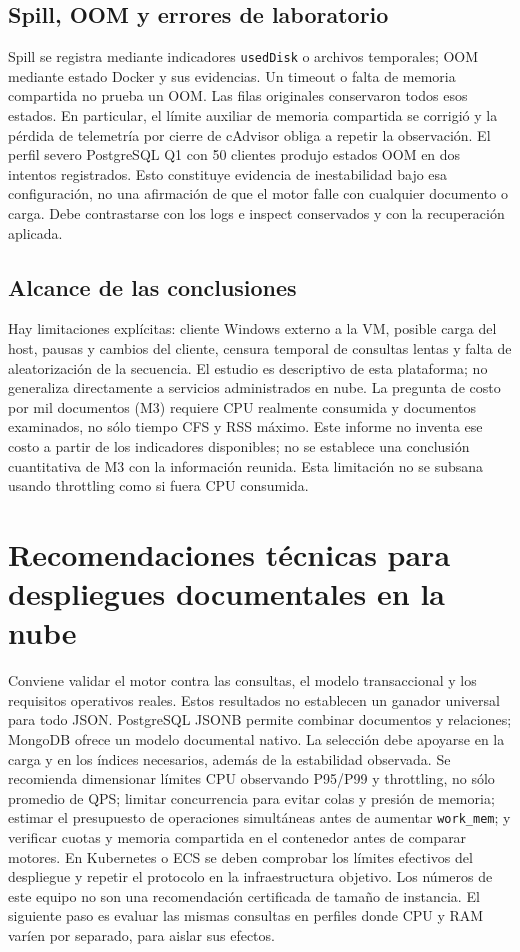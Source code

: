 \documentclass[11pt,letterpaper]{article}
\begin{document}
\subsection{Spill, OOM y errores de laboratorio}
Spill se registra mediante indicadores \texttt{usedDisk} o archivos temporales; OOM mediante estado Docker y sus evidencias. Un timeout o falta de memoria compartida no prueba un OOM. Las filas originales conservaron todos esos estados. En particular, el límite auxiliar de memoria compartida se corrigió y la pérdida de telemetría por cierre de cAdvisor obliga a repetir la observación.
El perfil severo PostgreSQL Q1 con 50 clientes produjo estados OOM en dos intentos registrados. Esto constituye evidencia de inestabilidad bajo esa configuración, no una afirmación de que el motor falle con cualquier documento o carga. Debe contrastarse con los logs e inspect conservados y con la recuperación aplicada.
\subsection{Alcance de las conclusiones}
Hay limitaciones explícitas: cliente Windows externo a la VM, posible carga del host, pausas y cambios del cliente, censura temporal de consultas lentas y falta de aleatorización de la secuencia. El estudio es descriptivo de esta plataforma; no generaliza directamente a servicios administrados en nube.
La pregunta de costo por mil documentos (M3) requiere CPU realmente consumida y documentos examinados, no sólo tiempo CFS y RSS máximo. Este informe no inventa ese costo a partir de los indicadores disponibles; no se establece una conclusión cuantitativa de M3 con la información reunida. Esta limitación no se subsana usando throttling como si fuera CPU consumida.
\section{Recomendaciones técnicas para despliegues documentales en la nube}
Conviene validar el motor contra las consultas, el modelo transaccional y los requisitos operativos reales. Estos resultados no establecen un ganador universal para todo JSON. PostgreSQL JSONB permite combinar documentos y relaciones; MongoDB ofrece un modelo documental nativo. La selección debe apoyarse en la carga y en los índices necesarios, además de la estabilidad observada.
Se recomienda dimensionar límites CPU observando P95/P99 y throttling, no sólo promedio de QPS; limitar concurrencia para evitar colas y presión de memoria; estimar el presupuesto de operaciones simultáneas antes de aumentar \texttt{work\_mem}; y verificar cuotas y memoria compartida en el contenedor antes de comparar motores.
En Kubernetes o ECS se deben comprobar los límites efectivos del despliegue y repetir el protocolo en la infraestructura objetivo. Los números de este equipo no son una recomendación certificada de tamaño de instancia. El siguiente paso es evaluar las mismas consultas en perfiles donde CPU y RAM varíen por separado, para aislar sus efectos.
\clearpage
\end{document}
